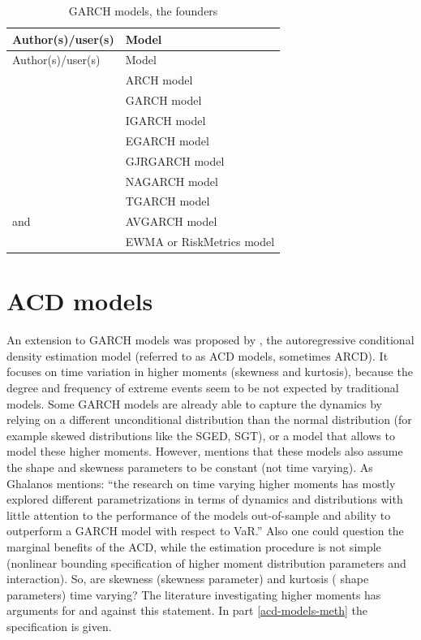 \documentclass[a4paper, nobind]{templates/ociamthesis}
\begin{document}
\newpage

\begin{longtable}[]{@{}ll@{}}
\caption{GARCH models, the founders}\tabularnewline
\toprule
Author(s)/user(s) & Model\tabularnewline
\midrule
\endfirsthead
\toprule
Author(s)/user(s) & Model\tabularnewline
\midrule
\endhead
\textcite{engle1982} & ARCH model\tabularnewline
\textcite{bollerslev1986} & GARCH model\tabularnewline
\textcite{bollerslev1986} & IGARCH model\tabularnewline
\textcite{nelson1991} & EGARCH model\tabularnewline
\textcite{glosten1993} & GJRGARCH model\tabularnewline
\textcite{engle1993} & NAGARCH model\tabularnewline
\textcite{zakoian1994} & TGARCH model\tabularnewline
\textcite{taylor1986} and \textcite{schwert1989} & AVGARCH model\tabularnewline
\textcite{morganguarantytrustcompany1996} & EWMA or RiskMetrics model\tabularnewline
\bottomrule
\end{longtable}

\hypertarget{acd-models}{%
\section{ACD models}\label{acd-models}}

An extension to GARCH models was proposed by \textcite{hansen1994}, the autoregressive conditional density estimation model (referred to as ACD models, sometimes ARCD). It focuses on time variation in higher moments (skewness and kurtosis), because the degree and frequency of extreme events seem to be not expected by traditional models. Some GARCH models are already able to capture the dynamics by relying on a different unconditional distribution than the normal distribution (for example skewed distributions like the SGED, SGT), or a model that allows to model these higher moments. However, \textcite{ghalanos2016} mentions that these models also assume the shape and skewness parameters to be constant (not time varying). As Ghalanos mentions: ``the research on time varying higher moments has mostly explored different parametrizations in terms of dynamics and distributions with little attention to the performance of the models out-of-sample and ability to outperform a GARCH model with respect to VaR.'' Also one could question the marginal benefits of the ACD, while the estimation procedure is not simple (nonlinear bounding specification of higher moment distribution parameters and interaction). So, are skewness (skewness parameter) and kurtosis ( shape parameters) time varying? The literature investigating higher moments has arguments for and against this statement. In part \ref{acd-models-meth} the specification is given.
\end{document}
